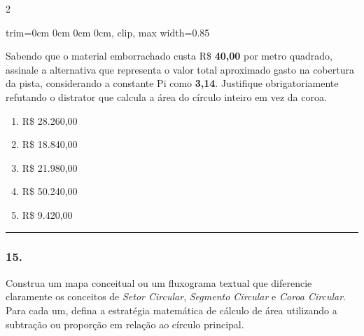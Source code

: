 \documentclass[twoside, 10pt, a4paper]{article}
\newlength{\espacoPreQuestao}\setlength{\espacoPreQuestao}{0.1cm}
\newlength{\espacoQuestao}\setlength{\espacoQuestao}{0.2cm}
\newlength{\espacoAlt}\setlength{\espacoAlt}{0.2cm}
\newcommand{\larguraTikz}{0.85\linewidth}
\begin{document}
\begin{multicols*}{2}
\begin{center}
\begin{adjustbox}{trim=0cm 0cm 0cm 0cm, clip, max width=\larguraTikz}
\end{adjustbox}
\end{center}
Sabendo que o material emborrachado custa R\$ \textbf{40,00} por metro quadrado, assinale a alternativa que representa o valor total aproximado gasto na cobertura da pista, considerando a constante Pi como \textbf{3,14}. Justifique obrigatoriamente refutando o distrator que calcula a área do círculo inteiro em vez da coroa.
\begin{enumerate}[label=\alph*), itemsep=\espacoAlt]
\item R\$ 28.260,00
\item R\$ 18.840,00
\item R\$ 21.980,00
\item R\$ 50.240,00
\item R\$ 9.420,00
\end{enumerate}
\par\vspace{\espacoQuestao}

\noindent\textcolor{CorLinha}{\rule{\linewidth}{0.5pt}} 
\par\vspace{\espacoPreQuestao}
\subsubsection*{15.} Construa um mapa conceitual ou um fluxograma textual que diferencie claramente os conceitos de \textit{Setor Circular}, \textit{Segmento Circular} e \textit{Coroa Circular}. Para cada um, defina a estratégia matemática de cálculo de área utilizando a subtração ou proporção em relação ao círculo principal.
\par\vspace{\espacoQuestao}


\end{multicols*}
\end{document}
